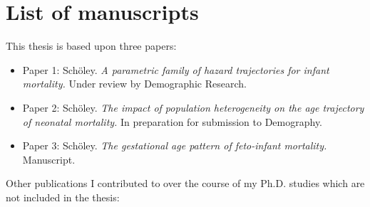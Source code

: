 \documentclass[
  10pt, twoside
]{book}
\begin{document}

\clearpage

\section*{List of manuscripts}

This thesis is based upon three papers:

\begin{itemize}
\item Paper 1: Schöley. \emph{A parametric family of hazard trajectories for infant mortality.} Under review by Demographic Research.
\item Paper 2: Schöley. \emph{The impact of population heterogeneity on the age trajectory of neonatal mortality.} In preparation for submission to Demography.
\item Paper 3: Schöley. \emph{The gestational age pattern of feto-infant mortality.} Manuscript.
\end{itemize}

Other publications I contributed to over the course of my Ph.D. studies which are not included in the thesis:
\end{document}

